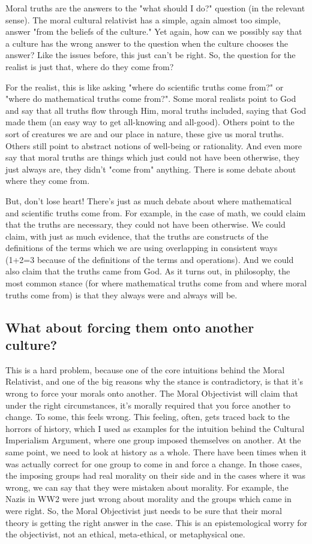 Moral truths are the answers to the "what should I do?" question (in the relevant sense). The moral cultural relativist has a simple, again almost too simple, answer "from the beliefs of the culture." Yet again, how can we possibly say that a culture has the wrong answer to the question when the culture chooses the answer? Like the issues before, this just can't be right. So, the question for the realist is just that, where do they come from? 

For the realist, this is like asking "where do scientific truths come from?" or "where do mathematical truths come from?". Some moral realists point to God and say that all truths flow through Him, moral truths included, saying that God made them (an easy way to get all-knowing and all-good). Others point to the sort of creatures we are and our place in nature, these give us moral truths. Others still point to abstract notions of well-being or rationality.  And even more say that moral truths are things which just could not have been otherwise, they just always are, they didn't "come from" anything. There is some debate about where they come from.

But, don't lose heart! There's just as much debate about where mathematical and scientific truths come from. For example, in the case of math, we could claim that the truths are necessary, they could not have been otherwise. We could claim, with just as much evidence, that the truths are constructs of the definitions of the terms which we are using overlapping in consistent ways (1+2=3 because of the definitions of the terms and operations). And we could also claim that the truths came from God.  As it turns out, in philosophy, the most common stance (for where mathematical truths come from and where moral truths come from) is that they always were and always will be.
\subsection{What about forcing them onto another culture?}

This is a hard problem, because one of the core intuitions behind the Moral Relativist, and one of the big reasons why the stance is contradictory, is that it’s wrong to force your morals onto another. The Moral Objectivist will claim that under the right circumstances, it’s morally required that you force another to change. To some, this feels wrong. This feeling, often, gets traced back to the horrors of history, which I used as examples for the intuition behind the Cultural Imperialism Argument, where one group imposed themselves on another. At the same point, we need to look at history as a whole. There have been times when it was actually correct for one group to come in and force a change. In those cases, the imposing groups had real morality on their side and in the cases where it was wrong, we can say that they were mistaken about morality. For example, the Nazis in WW2 were just wrong about morality and the groups which came in were right. So, the Moral Objectivist just needs to be sure that their moral theory is getting the right answer in the case. This is an epistemological worry for the objectivist, not an ethical, meta-ethical, or metaphysical one. 

